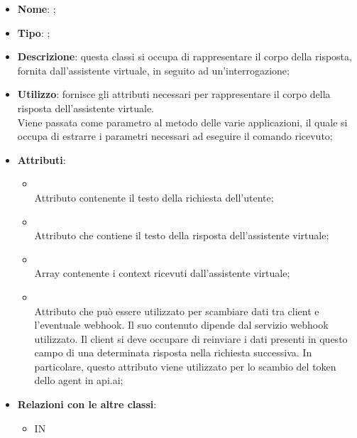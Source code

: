 \begin{itemize}
	\item \textbf{Nome}: ;
	\item \textbf{Tipo}: ;
	\item \textbf{Descrizione}: questa classi si occupa di rappresentare il corpo della risposta, fornita dall'assistente virtuale, in seguito ad un'interrogazione;
	\item \textbf{Utilizzo}: fornisce gli attributi necessari per rappresentare il corpo della risposta dell'assistente virtuale. \\
Viene passata come parametro al metodo  delle varie applicazioni, il quale si occupa di estrarre i parametri necessari ad eseguire il comando ricevuto;
	\item \textbf{Attributi}:
	\begin{itemize}
		\item[]  \\
		Attributo contenente il testo della richiesta dell'utente;
		\item[]  \\
		Attributo che contiene il testo della risposta dell'assistente virtuale;
		\item[]  \\
		Array contenente i context ricevuti dall'assistente virtuale;
		\item[]  \\
		Attributo che può essere utilizzato per scambiare dati tra client e l'eventuale webhook. Il suo contenuto dipende dal servizio webhook utilizzato. Il client si deve occupare di reinviare i dati presenti in questo campo di una determinata risposta nella richiesta successiva. In particolare, questo attributo viene utilizzato per lo scambio del token dello agent in api.ai;
	\end{itemize}
	\item \textbf{Relazioni con le altre classi}:
	\begin{itemize}
		\item IN \hyperlink{VAResponse_label}{}
	\end{itemize}
\end{itemize}
\FloatBarrier

